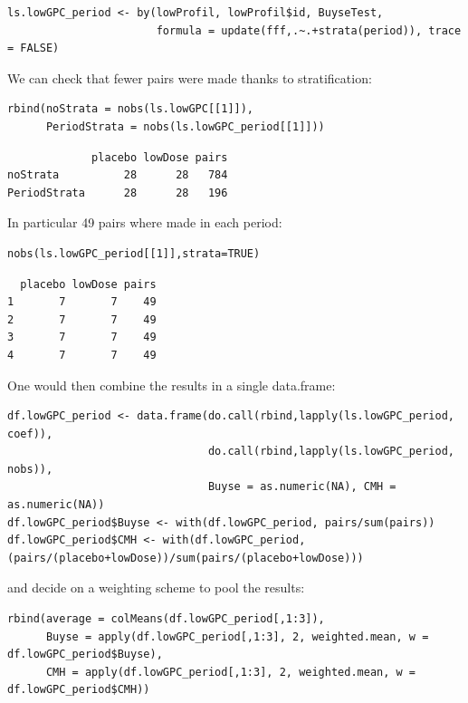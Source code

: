 \documentclass[12pt]{article}
\begin{document}
\lstset{language=r,label= ,caption= ,captionpos=b,numbers=none}
\begin{lstlisting}
ls.lowGPC_period <- by(lowProfil, lowProfil$id, BuyseTest,
                       formula = update(fff,.~.+strata(period)), trace = FALSE)
\end{lstlisting}

We can check that fewer pairs were made thanks to stratification:
\lstset{language=r,label= ,caption= ,captionpos=b,numbers=none}
\begin{lstlisting}
rbind(noStrata = nobs(ls.lowGPC[[1]]),
      PeriodStrata = nobs(ls.lowGPC_period[[1]]))
\end{lstlisting}

\begin{verbatim}
             placebo lowDose pairs
noStrata          28      28   784
PeriodStrata      28      28   196
\end{verbatim}


In particular 49 pairs where made in each period:
\lstset{language=r,label= ,caption= ,captionpos=b,numbers=none}
\begin{lstlisting}
nobs(ls.lowGPC_period[[1]],strata=TRUE)
\end{lstlisting}

\begin{verbatim}
  placebo lowDose pairs
1       7       7    49
2       7       7    49
3       7       7    49
4       7       7    49
\end{verbatim}


One would then combine the results in a single data.frame:
\lstset{language=r,label= ,caption= ,captionpos=b,numbers=none}
\begin{lstlisting}
df.lowGPC_period <- data.frame(do.call(rbind,lapply(ls.lowGPC_period, coef)),
                               do.call(rbind,lapply(ls.lowGPC_period, nobs)),
                               Buyse = as.numeric(NA), CMH = as.numeric(NA))
df.lowGPC_period$Buyse <- with(df.lowGPC_period, pairs/sum(pairs))
df.lowGPC_period$CMH <- with(df.lowGPC_period, (pairs/(placebo+lowDose))/sum(pairs/(placebo+lowDose)))
\end{lstlisting}

and decide on a weighting scheme to pool the results:
\lstset{language=r,label= ,caption= ,captionpos=b,numbers=none}
\begin{lstlisting}
rbind(average = colMeans(df.lowGPC_period[,1:3]),
      Buyse = apply(df.lowGPC_period[,1:3], 2, weighted.mean, w = df.lowGPC_period$Buyse),
      CMH = apply(df.lowGPC_period[,1:3], 2, weighted.mean, w = df.lowGPC_period$CMH))
\end{lstlisting}
\end{document}
